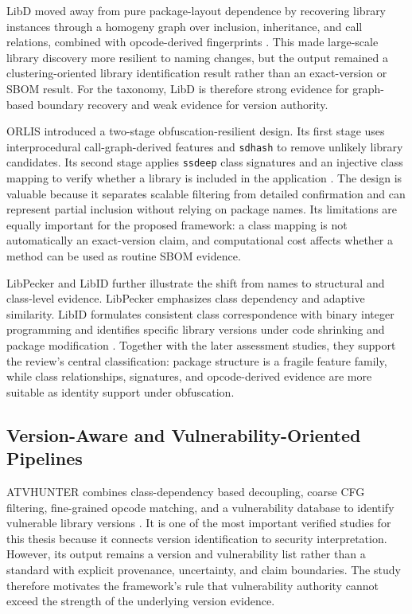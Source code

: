 LibD moved away from pure package-layout dependence by recovering library
instances through a homogeny graph over inclusion, inheritance, and call
relations, combined with opcode-derived fingerprints \cite{li2017libd}.
This made large-scale library discovery more resilient to naming changes, but
the output remained a clustering-oriented library identification result
rather than an exact-version or SBOM result. For the taxonomy, LibD is
therefore strong evidence for graph-based boundary recovery and weak evidence
for version authority.

ORLIS introduced a two-stage obfuscation-resilient design. Its first stage
uses interprocedural call-graph-derived features and \texttt{sdhash} to remove
unlikely library candidates. Its second stage applies \texttt{ssdeep} class
signatures and an injective class mapping to verify whether a library is
included in the application \cite{wang2018orlis}. The design is valuable
because it separates scalable filtering from detailed confirmation and can
represent partial inclusion without relying on package names. Its limitations
are equally important for the proposed framework: a class mapping is not
automatically an exact-version claim, and computational cost affects whether a
method can be used as routine SBOM evidence.

LibPecker and LibID further illustrate the shift from names to structural and
class-level evidence. LibPecker emphasizes class dependency and adaptive
similarity. LibID formulates consistent class correspondence with binary
integer programming and identifies specific library versions under code
shrinking and package modification
\cite{zhang2018libpecker,zhang2019libid}. Together with the later assessment
studies, they support the review's central classification: package structure
is a fragile feature family, while class relationships, signatures, and
opcode-derived evidence are more suitable as identity support under
obfuscation.

\subsection{Version-Aware and Vulnerability-Oriented Pipelines}

ATVHUNTER combines class-dependency based decoupling, coarse CFG filtering,
fine-grained opcode matching, and a vulnerability database to identify
vulnerable library versions \cite{zhan2021atvhunter}. It is one of the most
important verified studies for this thesis because it connects version
identification to security interpretation. However, its output remains a
version and vulnerability list rather than a standard \SBOM with explicit
provenance, uncertainty, and claim boundaries. The study therefore motivates
the framework's rule that vulnerability authority cannot exceed the strength
of the underlying version evidence.

